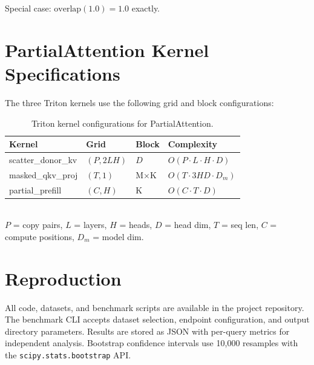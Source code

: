 \documentclass[11pt,twocolumn]{article}
\begin{document}
Special case: $\text{overlap}(1.0) = 1.0$ exactly.


\section{PartialAttention Kernel Specifications}
\label{app:kernels}

The three Triton kernels use the following grid and block configurations:

\begin{table}[h]
\centering
\caption{Triton kernel configurations for PartialAttention.}
\footnotesize
\begin{tabular}{@{}llll@{}}
\toprule
\textbf{Kernel} & \textbf{Grid} & \textbf{Block} & \textbf{Complexity} \\
\midrule
scatter\_donor\_kv & $(P, 2LH)$ & $D$ & $O(P \cdot L \cdot H \cdot D)$ \\
masked\_qkv\_proj & $(T, 1)$ & M$\times$K & $O(T \cdot 3HD \cdot D_m)$ \\
partial\_prefill & $(C, H)$ & K & $O(C \cdot T \cdot D)$ \\
\bottomrule
\end{tabular}\\[2pt]
{\footnotesize $P$ = copy pairs, $L$ = layers, $H$ = heads,
$D$ = head dim, $T$ = seq len, $C$ = compute positions,
$D_m$ = model dim.}
\end{table}


\section{Reproduction}
\label{app:reproduction}

All code, datasets, and benchmark scripts are available in the
project repository. The benchmark CLI accepts dataset selection,
endpoint configuration, and output directory parameters. Results
are stored as JSON with per-query metrics for independent analysis.
Bootstrap confidence intervals use 10,000 resamples with the
\texttt{scipy.stats.bootstrap} API.
\end{document}

